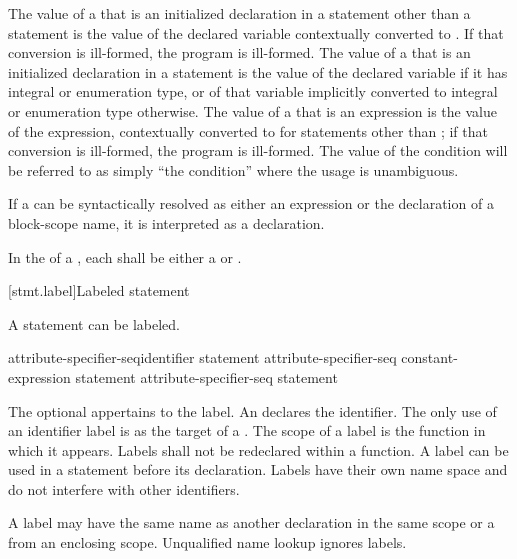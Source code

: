 \pnum
The value of a  that is an initialized declaration
in a statement other than a  statement is the value of the
declared variable
contextually converted to .
If that
conversion is ill-formed, the program is ill-formed. The value of a
 that is an initialized declaration in a
 statement is the value of the declared variable if it has
integral or enumeration type, or of that variable implicitly converted
to integral or enumeration type otherwise. The value of a
 that is an expression is the value of the
expression, contextually converted to 
for statements other
than ;
if that conversion is ill-formed, the program is
ill-formed. The value of the condition will be referred to as simply
``the condition'' where the usage is unambiguous.

\pnum
If a  can be syntactically resolved as either an
expression or the declaration of a block-scope name, it is interpreted as a
declaration.

\pnum
In the  of a , each
 shall be either a 
or .

[stmt.label]{Labeled statement}%

\pnum
{}%
%
A statement can be labeled.

\begin{bnf}
\br
    attribute-specifier-seq\opt identifier \terminal{:} statement\br
    attribute-specifier-seq\opt{}  constant-expression \terminal{:} statement\br
    attribute-specifier-seq\opt{}  statement
\end{bnf}

The optional  appertains to the label. An
 declares the identifier. The only use of an
identifier label is as the target of a
%
.
%
The scope of a label is the function in which it appears. Labels shall
not be redeclared within a function. A label can be used in a
 statement before its declaration.
%
Labels have their own name space and do not interfere with other
identifiers.
\begin{note}
A label may have the same name as another declaration in the same scope or a
 from an enclosing scope. Unqualified name
lookup ignores labels.
\end{note}

